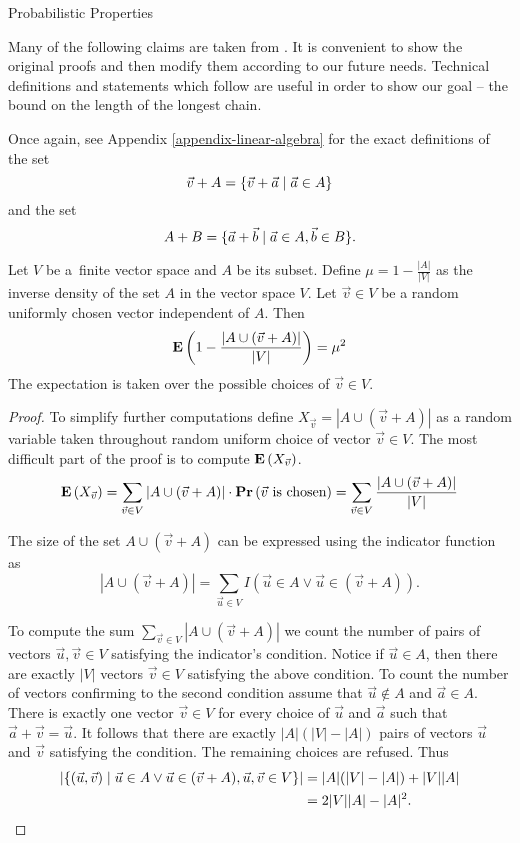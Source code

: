 \begin{section}{Probabilistic Properties}
\label{section-probabilistic-properties}

Many of the following claims are taken from \cite{DBLP:journals/jacm/AlonDMPT99}. It is convenient to show the original proofs and then modify them according to our future needs. Technical definitions and statements which follow are useful in order to show our goal -- the bound on the length of the longest chain.

Once again, see Appendix \ref{appendix-linear-algebra} for the exact definitions of the set \[ \vec{v} + A = \{ \vec{v} + \vec{a} \mid \vec{a} \in A \} \] and the set \[ A + B = \{ \vec{a} + \vec{b} \mid \vec{a} \in A, \vec{b} \in B \} \text{.} \]

\begin{lemma}
\label{lemma-choose-random-vector}
Let $V$ be a~finite vector space and $A$ be its subset. Define $\mu = 1 - \frac{|A|}{|V|}$ as the inverse density of the set $A$ in the vector space $V$. Let $\vec{v} \in V$ be a random uniformly chosen vector independent of $A$. Then
\begin{displaymath}
\mathbf{E}\left(1 - \frac{|A \cup (\vec{v} + A)|}{|V|}\right) = \mu^2
\end{displaymath}
The expectation is taken over the possible choices of $\vec{v} \in V$.

\begin{proof}
To simplify further computations define $X_{\vec{v}} = |A \cup (\vec{v} + A)|$ as a random variable taken throughout random uniform choice of vector $\vec{v} \in V$. The most difficult part of the proof is to compute $\mathbf{E}\left(X_{\vec{v}}\right)$.
\[
\mathbf{E}\left(X_{\vec{v}}\right) = \displaystyle\sum_{\vec{v} \in V} |A \cup (\vec{v} + A)| \cdot \mathbf{Pr}\left(\vec{v} \text{ is chosen}\right) = \displaystyle\sum_{\vec{v} \in V} \frac{|A \cup (\vec{v} + A)|}{|V|}
\]

The size of the set $A \cup (\vec{v} + A)$ can be expressed using the indicator function as
\[
|A \cup (\vec{v} + A)| = \displaystyle\sum_{\vec{u} \in V} I(\vec{u} \in A \vee \vec{u} \in (\vec{v} + A)) \text{.}
\]

To compute the sum $\sum_{\vec{v} \in V}|A \cup (\vec{v} + A)|$ we count the number of pairs of vectors $\vec{u}, \vec{v} \in V$ satisfying the indicator's condition. Notice if $\vec{u} \in A$, then there are exactly $|V|$ vectors $\vec{v} \in V$ satisfying the above condition. To count the number of vectors confirming to the second condition assume that $\vec{u} \notin A$ and $\vec{a} \in A$. There is exactly one vector $\vec{v} \in V$ for every choice of $\vec{u}$ and $\vec{a}$ such that $\vec{a} + \vec{v} = \vec{u}$. It follows that there are exactly $|A|(|V| - |A|)$ pairs of vectors $\vec{u}$ and $\vec{v}$ satisfying the condition. The remaining choices are refused. Thus
\[ 
\begin{split}
|\{(\vec{u}, \vec{v}) \mid \vec{u} \in A \vee \vec{u} \in (\vec{v} + A), \vec{u}, \vec{v} \in V \}| 
	& = |A|(|V| - |A|) + |V||A| \\
	& = 2|V||A| - |A|^2 \text{.} \\
\end{split}
\]


\end{proof}
\end{lemma}
\end{section}
